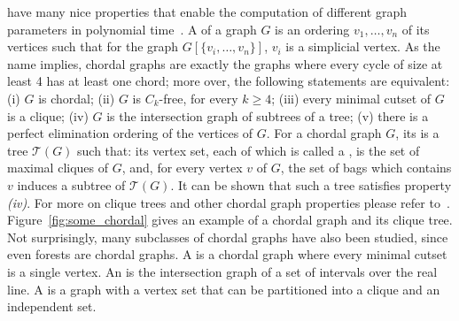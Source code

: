  have many nice properties that enable the computation of different graph parameters in polynomial time~\citep{golumbic}. A  of a graph $G$ is an ordering $v_1, \dots, v_n$ of its vertices such that for the graph $G[\{v_i, \dots, v_n\}]$, $v_i$ is a simplicial vertex. As the name implies, chordal graphs are exactly the graphs where every cycle of size at least 4 has at least one chord; more over, the following statements are equivalent: (i) $G$ is chordal; (ii) $G$ is $C_k$-free, for every $k \geq 4$; (iii) every minimal cutset of $G$ is a clique; (iv) $G$ is the intersection graph of subtrees of a tree; (v) there is a perfect elimination ordering of the vertices of $G$.
For a chordal graph $G$, its  is a tree $\mathcal{T}(G)$ such that: its vertex set, each of which is called a , is the set of maximal cliques of $G$, and, for every vertex $v$ of $G$, the set of bags which contains $v$ induces a subtree of $\mathcal{T}(G)$. It can be shown that such a tree satisfies property \textit{(iv)}.
For more on clique trees and other chordal graph properties please refer to~\citep{clique_tree}.
Figure~\ref{fig:some_chordal} gives an example of a chordal graph and its clique tree.
Not surprisingly, many subclasses of chordal graphs have also been studied, since even forests are chordal graphs.
A  is a chordal graph where every minimal cutset is a single vertex.
An  is the intersection graph of a set of intervals over the real line.
A  is a graph with a vertex set that can be partitioned into a clique and an independent set.

